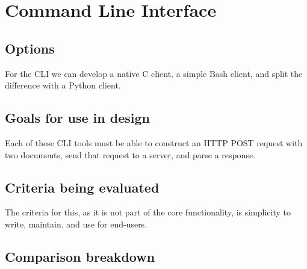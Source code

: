 \section{Command Line Interface}

\subsection{Options}

For the CLI we can develop a native C client, a simple Bash client, and split the difference with a Python client.

\subsection{Goals for use in design}

Each of these CLI tools must be able to construct an HTTP POST request with two documents, send that request to a server, and parse a response.

\subsection{Criteria being evaluated}

The criteria for this, as it is not part of the core functionality, is simplicity to write, maintain, and use for end-users.

\subsection{Comparison breakdown}

